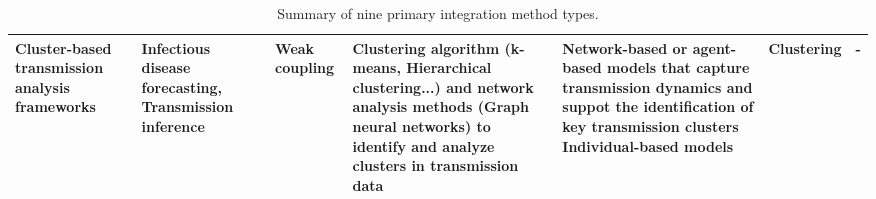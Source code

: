 \begin{table}[htbp]
{\begin{tabular}{|p{4cm}|p{5cm}|p{3cm}|p{4cm}|p{4cm}|p{4cm}|p{6cm}|}
Cluster-based transmission analysis frameworks &
Infectious disease forecasting, Transmission inference &
Weak coupling &
Clustering algorithm (k-means, Hierarchical clustering...) and network analysis methods (Graph neural networks) to identify and analyze clusters in transmission data &
Network-based or agent-based models that capture transmission dynamics and suppot the identification of key transmission clusters
Individual-based models &
Clustering & - \\ \hline
\end{tabular}%
}
\caption{Summary of nine primary integration method types.}
\label{tab:integration_methods}
\end{table}


